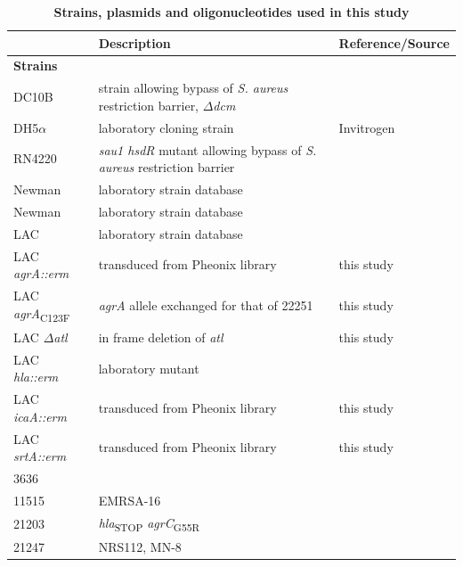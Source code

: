 \documentclass[10pt,letterpaper]{article}
\begin{document}
\begin{table}[!ht]
\begin{adjustwidth}{-2.25in}{0in} %
\centering
\caption{
{\bf Strains, plasmids and oligonucleotides used in this study}}
\begin{tabular}{|l|l|l|}
\hline
{ } & {\bf Description} & {\bf Reference/Source}\\ \hline
\multicolumn{3}{|l|}{\bf Strains}\\ \hline
DC10B & strain allowing bypass of \textit{S. aureus} restriction barrier, $\Delta$\textit{dcm} & \cite{monk_transforming_2012}\\ \hline
DH5$\alpha$ & laboratory cloning strain & Invitrogen\\ \hline
RN4220 & \textit{sau1 hsdR} mutant allowing bypass of \textit{S. aureus} restriction barrier & \cite{nair_whole-genome_2011}\\ \hline
Newman & laboratory strain database & \cite{wardenburg_surface_2007}\\ \hline
Newman & laboratory strain database & \cite{wardenburg_surface_2007}\\ \hline
LAC & laboratory strain database & \cite{bubeck_wardenburg_poring_2007}\\ \hline
LAC \textit{agrA::erm} & transduced from Pheonix library & this study\\ \hline
LAC \textit{agrA}\textsubscript{C123F} & \textit{agrA} allele exchanged for that of 22251 & this study\\ \hline
LAC $\Delta$\textit{atl} & in frame deletion of \textit{atl} & this study\\ \hline
LAC \textit{hla::erm} & laboratory mutant & \cite{bubeck_wardenburg_poring_2007}\\ \hline
LAC \textit{icaA::erm} & transduced from Pheonix library & this study\\ \hline
LAC \textit{srtA::erm} & transduced from Pheonix library & this study\\ \hline
3636 &  & \cite{deleo_molecular_2011}\\ \hline
11515 & EMRSA-16 & \cite{deleo_molecular_2011}\\ \hline
21203 & \textit{hla}\textsubscript{STOP} \textit{agrC}\textsubscript{G55R} & \cite{deleo_molecular_2011}\\ \hline
21247 & NRS112, MN-8 & \cite{deleo_molecular_2011}\\ \hline

\end{tabular}
\end{adjustwidth}
\end{table}
\end{document}
